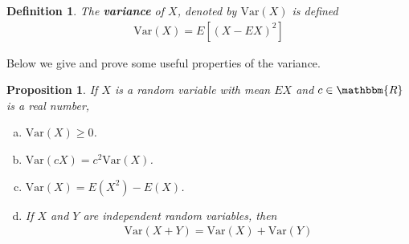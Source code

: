 \documentclass[11pt,letterpaper]{article}
\newcommand\real{\mathbbm{R}}
\newcommand\var{\text{Var}}
\numberwithin{theorem}{section}
\newtheorem{definition}[theorem]{Definition}
\numberwithin{definition}{section}
\numberwithin{lemma}{section}
\numberwithin{corollary}{section}
\newtheorem{proposition}[theorem]{Proposition}
\numberwithin{proposition}{section}
\theoremstyle{definition}
\numberwithin{remark}{section}
\numberwithin{claim}{section}
\numberwithin{observation}{section}
\numberwithin{fact}{section}
\numberwithin{assumption}{section}
\numberwithin{example}{section}
\numberwithin{exercise}{section}
\begin{document}
\begin{definition}
The \textbf{variance} of $X$, denoted by $\var(X)$ is defined 
\begin{align*}
\var(X) = E[(X - EX)^2]
\end{align*}
\end{definition}
Below we give and prove some useful properties of the variance.
\begin{proposition}
If $X$ is a random variable with mean $EX$ and $c \in \real$ is a real number,
\begin{enumerate}[(a)]
\item $\var(X) \geq 0$.

\item $\var(cX) = c^2 \var(X)$.

\item $\var(X) = E(X^2) - E(X)$.

\item If $X$ and $Y$ are independent random variables, then
\begin{align*}
    \var(X + Y) = \var(X) + \var(Y)
\end{align*}
\end{enumerate}
\end{proposition}
\end{document}
